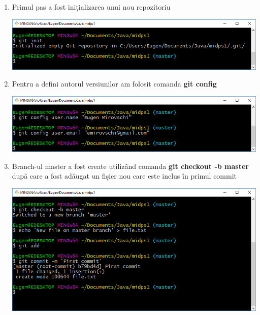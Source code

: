 \begin{enumerate}

\item Primul pas a fost inițializarea unui nou repozitoriu

\begin{minipage}{\linewidth}
	\centering
	\includegraphics[width=17cm]{01init}
\end{minipage}
\break

\item Pentru a defini autorul versiunilor am folosit comanda \textbf{git config}

\begin{minipage}{\linewidth}
	\centering
	\includegraphics[width=17cm]{02config}
\end{minipage}
\break

\item Branch-ul master a fost create utilizând comanda \textbf{git checkout -b master} după care a fost adăugat un fișier nou care este inclus în primul commit

\begin{minipage}{\linewidth}
	\centering
	\includegraphics[width=17cm]{03masterBranch}
\end{minipage}
\break


\end{enumerate}
